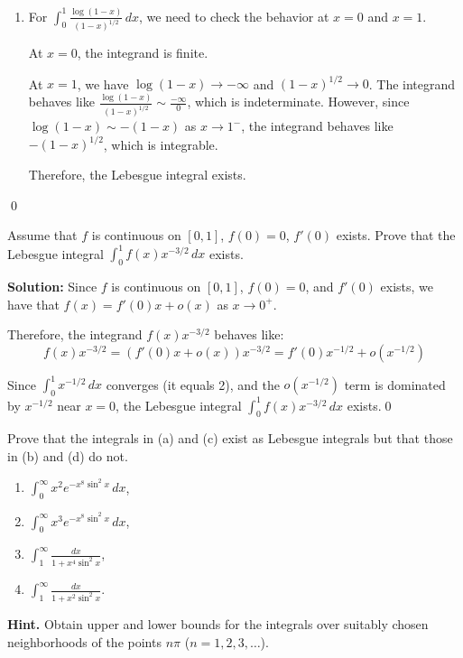 \begin{enumerate}[label=(\alph*)]
    \item For $\int_{0}^{1} \frac{\log (1 - x)}{(1 - x)^{1/2}} \, dx$, we need to check the behavior at $x = 0$ and $x = 1$.
    
    At $x = 0$, the integrand is finite.
    
    At $x = 1$, we have $\log (1 - x) \to -\infty$ and $(1 - x)^{1/2} \to 0$. The integrand behaves like $\frac{\log (1 - x)}{(1 - x)^{1/2}} \sim \frac{-\infty}{0}$, which is indeterminate. However, since $\log (1 - x) \sim -(1 - x)$ as $x \to 1^-$, the integrand behaves like $-(1 - x)^{1/2}$, which is integrable.
    
    Therefore, the Lebesgue integral exists.
\end{enumerate}\qed


\begin{problembox}
Assume that $f$ is continuous on $[0, 1]$, $f(0) = 0$, $f'(0)$ exists. Prove that the Lebesgue integral $\int_{0}^{1} f(x)x^{-3/2} \, dx$ exists.
\end{problembox}

\noindent\textbf{Solution:}
Since $f$ is continuous on $[0, 1]$, $f(0) = 0$, and $f'(0)$ exists, we have that $f(x) = f'(0)x + o(x)$ as $x \to 0^+$.

Therefore, the integrand $f(x)x^{-3/2}$ behaves like:
\[f(x)x^{-3/2} = (f'(0)x + o(x))x^{-3/2} = f'(0)x^{-1/2} + o(x^{-1/2})\]

Since $\int_{0}^{1} x^{-1/2} \, dx$ converges (it equals 2), and the $o(x^{-1/2})$ term is dominated by $x^{-1/2}$ near $x = 0$, the Lebesgue integral $\int_{0}^{1} f(x)x^{-3/2} \, dx$ exists.\qed


\begin{problembox}
Prove that the integrals in (a) and (c) exist as Lebesgue integrals but that those in (b) and (d) do not.
\begin{enumerate}[label=(\alph*)]
    \item $\int_{0}^{\infty} x^2 e^{-x^8 \sin^2 x} \, dx$,
    \item $\int_{0}^{\infty} x^3 e^{-x^8 \sin^2 x} \, dx$,
    \item $\int_{1}^{\infty} \frac{dx}{1 + x^4 \sin^2 x}$,
    \item $\int_{1}^{\infty} \frac{dx}{1 + x^2 \sin^2 x}.$
\end{enumerate}
\textbf{Hint.} Obtain upper and lower bounds for the integrals over suitably chosen neighborhoods of the points $n\pi$ ($n = 1, 2, 3, \ldots$).
\end{problembox}


